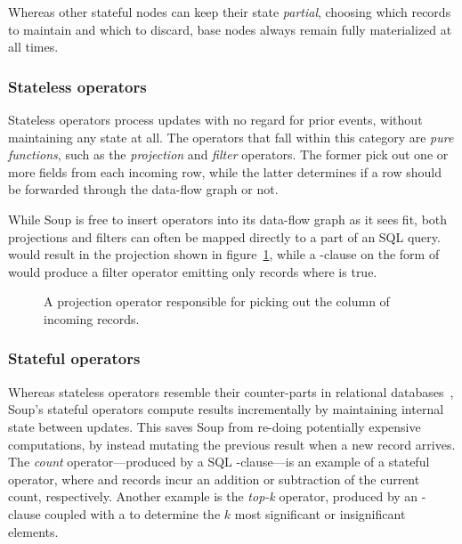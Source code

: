 Whereas other stateful nodes can keep their state \textit{partial}, choosing
which records to maintain and which to discard, base nodes always remain fully
materialized at all times.

\subsubsection{Stateless operators}

Stateless operators process updates with no regard for prior events, without
maintaining any state at all. The operators that fall within this category are
\textit{pure functions}, such as the \textit{projection} and \textit{filter}
operators. The former pick out one or more fields from each incoming row, while
the latter determines if a row should be forwarded through the data-flow graph
or not.

While Soup is free to insert operators into its data-flow graph as it sees fit,
both projections and filters can often be mapped directly to a part of an SQL
query.  would result in the projection shown in
figure~\ref{fig:project}, while a -clause on the form of  would produce a filter operator emitting only records where  is true.

\begin{figure}[H]
  \centering
  
  \caption{A projection operator responsible for picking out the 
  column of incoming records.}\label{fig:project}
\end{figure}

\subsubsection{Stateful operators}

Whereas stateless operators resemble their counter-parts in relational
databases~\cite{codd}, Soup's stateful operators compute results incrementally
by maintaining internal state between updates. This saves Soup from re-doing
potentially expensive computations, by instead mutating the previous result when
a new record arrives. The \textit{count} operator---produced by a SQL
-clause---is an example of a stateful operator, where
 and  records incur an addition or subtraction of
the current count, respectively. Another example is the \textit{top-k} operator,
produced by \eg an -clause coupled with a  to
determine the $ k $ most significant or insignificant elements.

